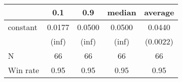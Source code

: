 \begin{tabular}{lcccc}
\hline
         &  0.1   &  0.9   & median & average   \\
\midrule
\midrule
constant & 0.0177 & 0.0500 & 0.0500 & 0.0440    \\
         & (inf)  & (inf)  & (inf)  & (0.0022)  \\
N        & 66     & 66     & 66     & 66        \\
Win rate & 0.95   & 0.95   & 0.95   & 0.95      \\
\hline
\end{tabular}
